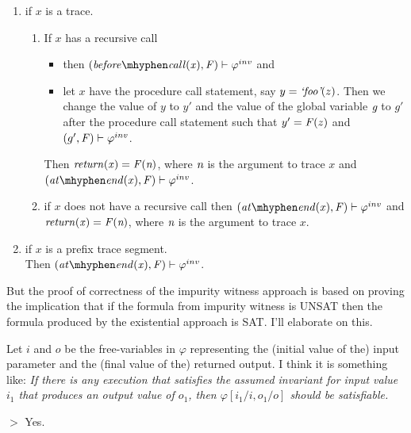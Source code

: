 \begin{enumerate}
\begin{definition}
  \begin{enumerate}
  \item if $x$ is a trace.
    \begin{enumerate}
    \item If $x$ has a recursive call
      \begin{itemize}
      \item then $(\beforeCall{x}, \F) \satisfies \inv$ and
      \item let $x$ have the procedure call statement, say $y =
        \textit{`foo'}(z)$. Then we change the value of $y$ to $y'$ and the
        value of the global variable $\textit{g}$ to $g'$ after the procedure
        call statement such that $y' = \mathit{F}(z)$ and $(g', \mathit{F})
        \vdash \varphi^{inv}$.
      \end{itemize}
      Then $\mathit{return(x)} = \mathit{F}(\textit{n})$, where $\textit{n}$ is the argument to
      trace $x$ and $(\atEnd{x}, \F) \satisfies \inv$.
    \item if $x$ does not have a recursive call
      then $(\atEnd{x}, \F) \satisfies \inv$ and $\mathit{return(x)} =
      \mathit{F}(\textit{n})$, where $\textit{n}$ is the argument to trace $x$.
    \end{enumerate}
  \item if $x$ is a prefix trace segment.\\
    Then $(\atEnd{x}, \F) \satisfies \inv$.
  \end{enumerate}
\end{definition}


But the proof of correctness of the impurity witness approach is based
on proving the implication that if the formula from impurity witness
is UNSAT then the formula produced by the existential approach is
SAT. I'll elaborate on this.

Let $i$ and $o$ be the free-variables in $\varphi$
representing the (initial value of the) input parameter and the
(final value of the) returned output. I think it is something like:
\emph{
If there is any execution that
satisfies the assumed invariant for input value $i_1$ that produces
an output value of $o_1$, then $\varphi[i_1/i,o_1/o]$ should be
satisfiable.
}

$>$ Yes.

\end{enumerate}

